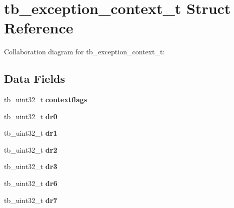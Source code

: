 \hypertarget{structtb__exception__context__t}{\section{tb\-\_\-exception\-\_\-context\-\_\-t Struct Reference}
\label{structtb__exception__context__t}
}


Collaboration diagram for tb\-\_\-exception\-\_\-context\-\_\-t\-:
\subsection*{Data Fields}
\begin{DoxyCompactItemize}
\item 
\hypertarget{structtb__exception__context__t_aadf61cf862f0e6ce485a046d170fc457}{tb\-\_\-uint32\-\_\-t {\bfseries contextflags}}\label{structtb__exception__context__t_aadf61cf862f0e6ce485a046d170fc457}

\item 
\hypertarget{structtb__exception__context__t_a958212953455d415733b4c500f41bd01}{tb\-\_\-uint32\-\_\-t {\bfseries dr0}}\label{structtb__exception__context__t_a958212953455d415733b4c500f41bd01}

\item 
\hypertarget{structtb__exception__context__t_a3debe317dcaddd15e437530b51daf49a}{tb\-\_\-uint32\-\_\-t {\bfseries dr1}}\label{structtb__exception__context__t_a3debe317dcaddd15e437530b51daf49a}

\item 
\hypertarget{structtb__exception__context__t_a999f122e6d2f3ecdf1801acd9045b958}{tb\-\_\-uint32\-\_\-t {\bfseries dr2}}\label{structtb__exception__context__t_a999f122e6d2f3ecdf1801acd9045b958}

\item 
\hypertarget{structtb__exception__context__t_aa5a6f6aa14f395afd2080b163664dc0a}{tb\-\_\-uint32\-\_\-t {\bfseries dr3}}\label{structtb__exception__context__t_aa5a6f6aa14f395afd2080b163664dc0a}

\item 
\hypertarget{structtb__exception__context__t_a0b3dfe2dbecba233611fd94f7a331d29}{tb\-\_\-uint32\-\_\-t {\bfseries dr6}}\label{structtb__exception__context__t_a0b3dfe2dbecba233611fd94f7a331d29}

\item 
\hypertarget{structtb__exception__context__t_a3abf302920d3865da1be1234f2ed1785}{tb\-\_\-uint32\-\_\-t {\bfseries dr7}}\label{structtb__exception__context__t_a3abf302920d3865da1be1234f2ed1785}


\end{DoxyCompactItemize}
